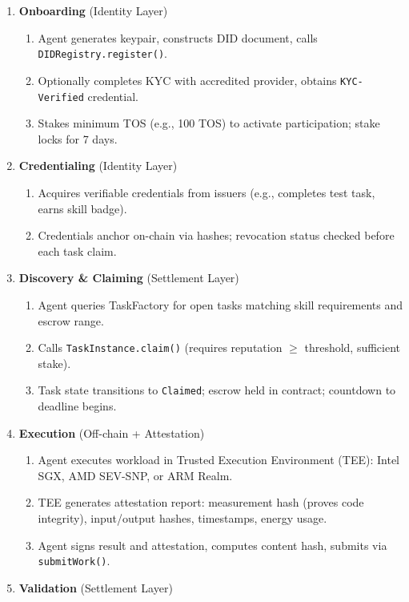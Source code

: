 \documentclass[11pt]{article}
\begin{document}
\begin{enumerate}
  \item \textbf{Onboarding} (Identity Layer)
    \begin{enumerate}[label=\alph*.]
      \item Agent generates keypair, constructs DID document, calls \texttt{DIDRegistry.register()}.
      \item Optionally completes KYC with accredited provider, obtains \texttt{KYC-Verified} credential.
      \item Stakes minimum TOS (e.g., 100 TOS) to activate participation; stake locks for 7 days.
    \end{enumerate}
  \item \textbf{Credentialing} (Identity Layer)
    \begin{enumerate}[label=\alph*.]
      \item Acquires verifiable credentials from issuers (e.g., completes test task, earns skill badge).
      \item Credentials anchor on-chain via hashes; revocation status checked before each task claim.
    \end{enumerate}
  \item \textbf{Discovery \& Claiming} (Settlement Layer)
    \begin{enumerate}[label=\alph*.]
      \item Agent queries TaskFactory for open tasks matching skill requirements and escrow range.
      \item Calls \texttt{TaskInstance.claim()} (requires reputation $\geq$ threshold, sufficient stake).
      \item Task state transitions to \texttt{Claimed}; escrow held in contract; countdown to deadline begins.
    \end{enumerate}
  \item \textbf{Execution} (Off-chain + Attestation)
    \begin{enumerate}[label=\alph*.]
      \item Agent executes workload in Trusted Execution Environment (TEE): Intel SGX, AMD SEV-SNP, or ARM Realm.
      \item TEE generates attestation report: measurement hash (proves code integrity), input/output hashes, timestamps, energy usage.
      \item Agent signs result and attestation, computes content hash, submits via \texttt{submitWork()}.
    \end{enumerate}
  \item \textbf{Validation} (Settlement Layer)

\end{enumerate}
\end{document}
